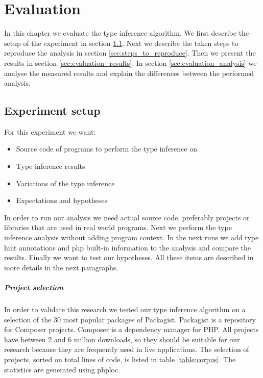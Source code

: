 \documentclass[../main.tex]{subfiles}
\begin{document}
    \chapter{Evaluation}\label{ch:evaluation}
	In this chapter we evaluate the type inference algorithm.
	We first describe the setup of the experiment in section \ref{sec:evaluation_experiment_setup}.
	Next we describe the taken steps to reproduce the analysis in section \ref{sec:steps_to_reproduce}.
	Then we present the results in section \ref{sec:evaluation_results}.
	In section \ref{sec:evaluation_analysis} we analyse the measured results and explain the differences between the performed analysis.
	
	\section{Experiment setup}\label{sec:evaluation_experiment_setup}
	
	For this experiment we want:
	\begin{itemize}
		\item Source code of programs to perform the type inference on
		\item Type inference results
		\item Variations of the type inference
		\item Expectations and hypotheses
	\end{itemize}
	In order to run our analysis we need actual source code, preferably projects or libraries that are used in real world programs.
	Next we perform the type inference analysis without adding program context.
	In the next runs we add type hint annotations and php built-in information to the analysis and compare the results.
	Finally we want to test our hypotheses.
	All these items are described in more details in the next paragraphs.
	
	\paragraph{Project selection}
	In order to validate this research we tested our type inference algorithm on a selection of the 30 most popular packages of Packagist\footnotemark.
	Packagist is a repository for Composer\footnotemark{} projects.
	Composer is a dependency manager for PHP.
	All projects have between 2 and 6 million downloads, so they should be suitable for our research because they are frequently used in live applications.
	The selection of projects, sorted on total lines of code, is listed in table \ref{table:corpus}.
	The statistics are generated using phploc\footnotemark.
\end{document}
